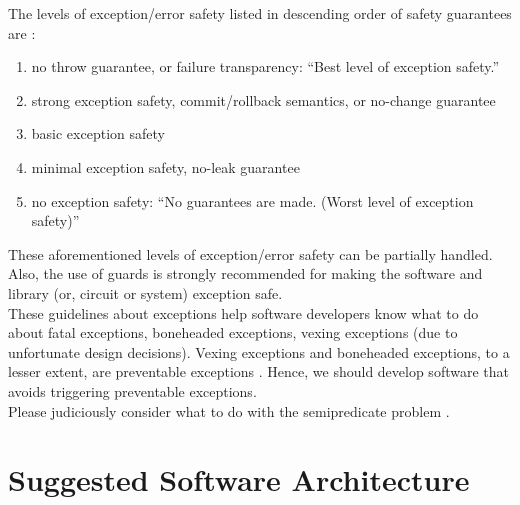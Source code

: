 \documentclass[letter,12pt]{article}
\begin{document}

The levels of exception/error safety listed in descending order of safety guarantees are \cite{Abrahams1998,Abrahams2001,WikibooksContributors2016,WikipediaContributors2016f}: \vspace{-0.3cm}
\begin{enumerate} \itemsep -4pt
\item no throw guarantee, or failure transparency: ``Best level of exception safety.''
\item strong exception safety, commit/rollback semantics, or no-change guarantee
\item basic exception safety
\item minimal exception safety, no-leak guarantee
\item no exception safety: ``No guarantees are made. (Worst level of exception safety)''
\end{enumerate}

These aforementioned levels of exception/error safety can be partially handled. Also, the use of guards is strongly recommended for making the software and library (or, circuit or system) exception safe. \\

These guidelines about exceptions help software developers know what to do about fatal exceptions, boneheaded exceptions, vexing exceptions (due to unfortunate design decisions). Vexing exceptions and boneheaded exceptions, to a lesser extent, are preventable exceptions \cite{Lippert2008}. Hence, we should develop software that avoids triggering preventable exceptions. \\

Please judiciously consider what to do with the semipredicate problem \cite{WikipediaContributors2016e}.



\section{Suggested Software Architecture}
\label{sec:SuggestedSoftwareArchitecture}
\end{document}
